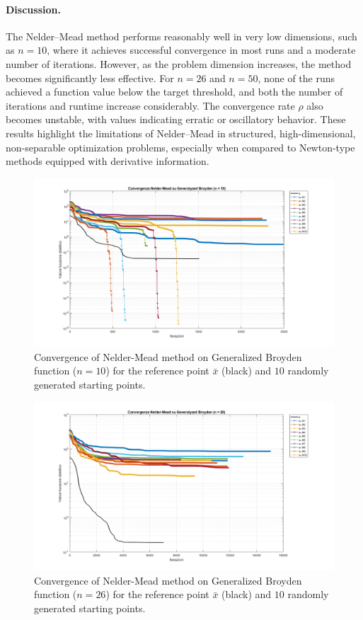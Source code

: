 \documentclass[a4paper,12pt]{article}
\begin{document}
	\paragraph{Discussion.}
	The Nelder–Mead method performs reasonably well in very low dimensions, such as $n = 10$, where it achieves successful convergence in most runs and a moderate number of iterations. However, as the problem dimension increases, the method becomes significantly less effective. For $n = 26$ and $n = 50$, none of the runs achieved a function value below the target threshold, and both the number of iterations and runtime increase considerably. The convergence rate $\rho$ also becomes unstable, with values indicating erratic or oscillatory behavior. These results highlight the limitations of Nelder–Mead in structured, high-dimensional, non-separable optimization problems, especially when compared to Newton-type methods equipped with derivative information.
	
	\begin{figure}[htbp]
		\centering
		\includegraphics[width=\textwidth]{../immagini/broyden_10.png}
		\caption{Convergence of Nelder-Mead method on Generalized Broyden function ($n=10$) for the reference point $\bar{x}$ (black) and $10$ randomly generated starting points.}
		\label{fig:gb_nelder_10}
	\end{figure}
	
	\begin{figure}[htbp]
		\centering
		\includegraphics[width=\textwidth]{../immagini/broyden_26.png}
		\caption{Convergence of Nelder-Mead method on Generalized Broyden function ($n=26$) for the reference point $\bar{x}$ (black) and $10$ randomly generated starting points.}
		\label{fig:gb_nelder_26}
	\end{figure}
	
\end{document}
